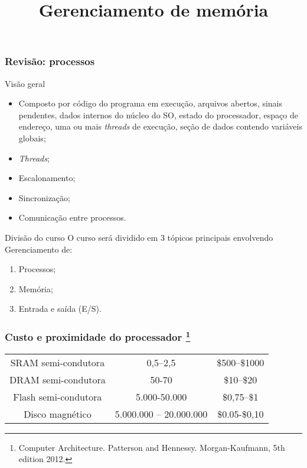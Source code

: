 
\title{Gerenciamento de memória}

\frame{\titlepage}

\begin{frame}
\frametitle{Revis\~ao: processos}

 \begin{block}{Visão geral}
        \begin{itemize}
        \item Composto por código do programa em execução, arquivos
          abertos, sinais pendentes, dados internos do núcleo do SO,
          estado do processador, espaço de endereço, uma ou mais {\em
            threads} de execução, seção de dados contendo variáveis globais;
            \item \textit{Threads};
          \item Escalonamento;
          \item Sincronização;
          \item Comunicação entre processos.
           
        \end{itemize}
      \end{block}

\end{frame}

\begin{frame}{Divisão do curso}
  \footnotesize
  O curso será dividido em $3$ tópicos principais envolvendo
  Gerenciamento de:
  \begin{enumerate}
  \item Processos;
  \item {\large\alert{Memória}};
  \item Entrada e saída (E/S).
  \end{enumerate}
\end{frame}


\def\headcolor{blue!80!black}

\begin{frame}
\frametitle{Custo e proximidade do processador
\footnote{\scriptsize Computer Architecture. 
Patterson and Hennessy. Morgan-Kaufmann, 5th edition 2012.}}
\small  
  \begin{tabular}[h]{c|c|c} \hline
    \color{\headcolor}{Tecnologia} &  \color{\headcolor}{Tempo de acesso (ns)} &  \color{\headcolor}{US\$ por GB (2012)}\\ \hline
    SRAM semi-condutora & 0,5--2,5 & \$500--\$1000\\
    DRAM semi-condutora& 50-70 & \$10--\$20\\
    Flash semi-condutora& 5.000-50.000 & \$0,75--\$1\\
    Disco magnético & 5.000.000 -- 20.000.000 & \$0.05-\$0,10\\ \hline
  \end{tabular}
  
\end{frame}

